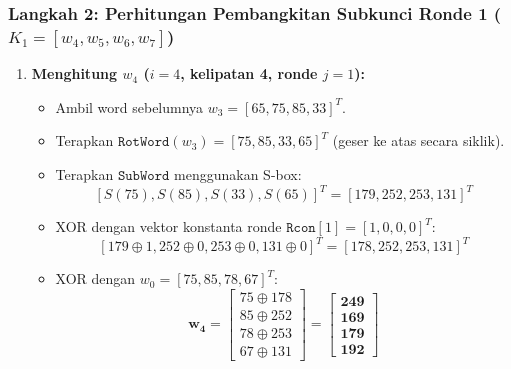\documentclass[11pt,a4paper]{article}
\begin{document}
\subsubsection*{Langkah 2: Perhitungan Pembangkitan Subkunci Ronde 1 ($K_1 = [w_4, w_5, w_6, w_7]$)}

\begin{enumerate}[leftmargin=*]
    \item \textbf{Menghitung $w_4$ ($i=4$, kelipatan 4, ronde $j=1$):}
    \begin{itemize}
        \item Ambil word sebelumnya $w_3 = [65, 75, 85, 33]^T$.
        \item Terapkan $\mathtt{RotWord}(w_3) = [75, 85, 33, 65]^T$ (geser ke atas secara siklik).
        \item Terapkan $\mathtt{SubWord}$ menggunakan S-box:
        $$[S(75), S(85), S(33), S(65)]^T = [179, 252, 253, 131]^T$$
        \item XOR dengan vektor konstanta ronde $\mathtt{Rcon}[1] = [1, 0, 0, 0]^T$:
        $$[179 \oplus 1, 252 \oplus 0, 253 \oplus 0, 131 \oplus 0]^T = [178, 252, 253, 131]^T$$
        \item XOR dengan $w_0 = [75, 85, 78, 67]^T$:
        $$\mathbf{w_4} = \begin{bmatrix} 75 \oplus 178 \\ 85 \oplus 252 \\ 78 \oplus 253 \\ 67 \oplus 131 \end{bmatrix} = \mathbf{\begin{bmatrix} 249 \\ 169 \\ 179 \\ 192 \end{bmatrix}}$$
    \end{itemize}


\end{enumerate}
\end{document}

